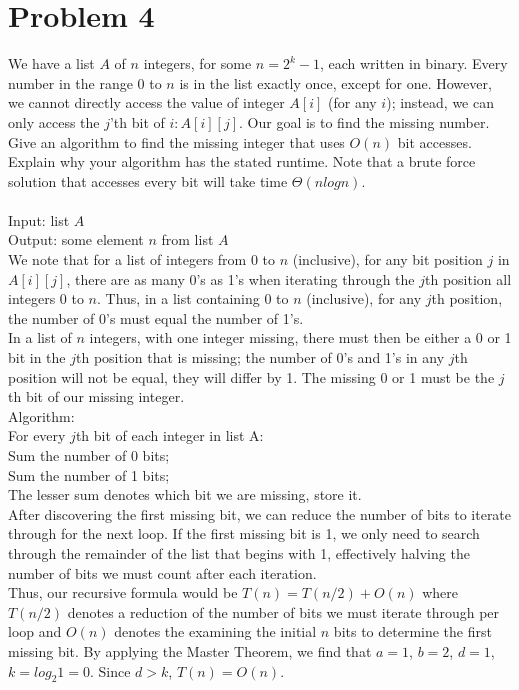 \documentclass[11pt,letterpaper]{article}
\newcommand\tab[1][1cm]{\hspace*{#1}}
\begin{document}
\section{Problem 4}
We have a list $A$ of $n$ integers, for some $n=2^{k}-1$, each written in binary. Every number in the range 0 to $n$ is in the list exactly once, except for one. However, we cannot directly access the value of integer $A[i]$ (for any $i$); instead, we can only access the $j$'th bit of $i: A[i][j]$. Our goal is to find the missing number. \\
Give an algorithm to find the missing integer that uses $O(n)$ bit accesses. Explain why your algorithm has the stated runtime. Note that a brute force solution that accesses every bit will take time $\Theta(nlogn)$. \\\\
Input: list $A$ \\
Output: some element $n$ from list $A$ \\
We note that for a list of integers from 0 to $n$ (inclusive), for any bit position $j$ in $A[i][j]$, there are as many 0's as 1's when iterating through the $j$th position all integers 0 to $n$. Thus, in a list containing 0 to $n$ (inclusive), for any $j$th position, the number of 0's must equal the number of 1's. \\
In a list of $n$ integers, with one integer missing, there must then be either a 0 or 1 bit in the $j$th position that is missing; the number of 0's and 1's in any $j$th position will not be equal, they will differ by 1. The missing 0 or 1 must be the $j$th bit of our missing integer. \\
Algorithm: \\
\tab
For every $j$th bit of each integer in list A: \\
\tab \tab Sum the number of 0 bits; \\
\tab \tab Sum the number of 1 bits; \\
\tab \tab The lesser sum denotes which bit we are missing, store it. \\
After discovering the first missing bit, we can reduce the number of bits to iterate through for the next loop. If the first missing bit is 1, we only need to search through the remainder of the list that begins with 1, effectively halving the number of bits we must count after each iteration. \\
Thus, our recursive formula would be $T(n) = T(n/2) + O(n)$ where $T(n/2)$ denotes a reduction of the number of bits we must iterate through per loop and $O(n)$ denotes the examining the initial $n$ bits to determine the first missing bit. By applying the Master Theorem, we find that $a = 1$, $b = 2$, $d = 1$, $k = log_{2}1 = 0$. Since $d > k$, $T(n) = O(n)$.
\end{document}
